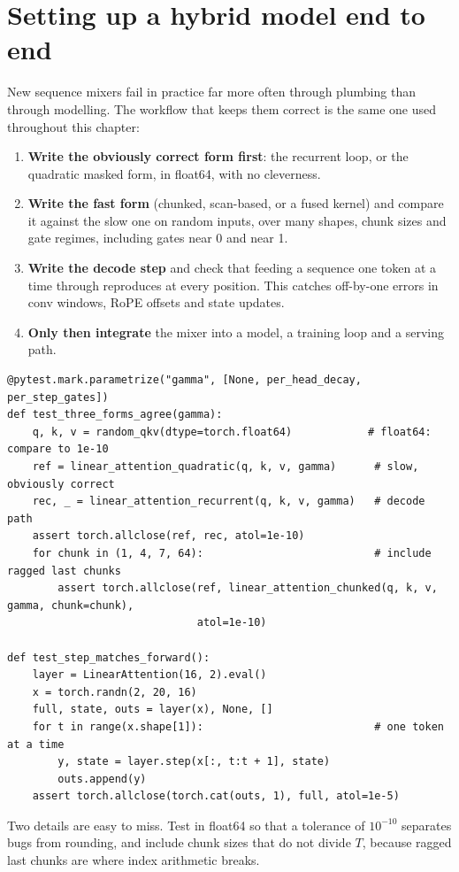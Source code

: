 \section{Setting up a hybrid model end to end}\label{sec:attnalt:setup}

New sequence mixers fail in practice far more often through plumbing than through modelling. The
workflow that keeps them correct is the same one used throughout this chapter:
\begin{enumerate}
\item \textbf{Write the obviously correct form first}: the recurrent loop, or the quadratic masked form,
  in float64, with no cleverness.
\item \textbf{Write the fast form} (chunked, scan-based, or a fused kernel) and compare it against the slow
  one on random inputs, over many shapes, chunk sizes and gate regimes, including gates near 0 and near 1.
\item \textbf{Write the decode step} and check that feeding a sequence one token at a time through
   reproduces  at every position. This catches off-by-one errors in conv windows,
  RoPE offsets and state updates.
\item \textbf{Only then integrate} the mixer into a model, a training loop and a serving path.
\end{enumerate}

\begin{lstlisting}[caption={The equivalence-test pattern used for every mixer in this chapter (from Lab 8).},label={lst:attnalt:test}]
@pytest.mark.parametrize("gamma", [None, per_head_decay, per_step_gates])
def test_three_forms_agree(gamma):
    q, k, v = random_qkv(dtype=torch.float64)            # float64: compare to 1e-10
    ref = linear_attention_quadratic(q, k, v, gamma)      # slow, obviously correct
    rec, _ = linear_attention_recurrent(q, k, v, gamma)   # decode path
    assert torch.allclose(ref, rec, atol=1e-10)
    for chunk in (1, 4, 7, 64):                           # include ragged last chunks
        assert torch.allclose(ref, linear_attention_chunked(q, k, v, gamma, chunk=chunk),
                              atol=1e-10)

def test_step_matches_forward():
    layer = LinearAttention(16, 2).eval()
    x = torch.randn(2, 20, 16)
    full, state, outs = layer(x), None, []
    for t in range(x.shape[1]):                           # one token at a time
        y, state = layer.step(x[:, t:t + 1], state)
        outs.append(y)
    assert torch.allclose(torch.cat(outs, 1), full, atol=1e-5)
\end{lstlisting}
Two details are easy to miss. Test in float64 so that a tolerance of $10^{-10}$ separates bugs from rounding,
and include chunk sizes that do not divide $T$, because ragged last chunks are where index arithmetic breaks.


